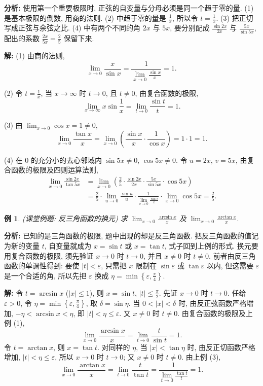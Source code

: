 \documentclass[UTF8,openany]{ctexbook}
\theoremstyle{chinesetextbook}
\newtheorem{example}{例}[section]
\newenvironment{cnsolution}{\par\indent\textbf{解:} \ignorespaces}{\par}
\begin{document}
\par\indent\textbf{分析:} 使用第一个重要极限时, 正弦的自变量与分母必须是同一个趋于零的量. (1) 是基本极限的倒数, 用商的法则. (2) 中趋于零的量是 $\displaystyle\frac1x$, 所以令 $\displaystyle t=\frac1x$. (3) 把正切写成正弦与余弦之比. (4) 中有两个不同的角 $2x$ 与 $5x$, 要分别配成 $\displaystyle\frac{\sin2x}{2x}$ 与 $\displaystyle\frac{5x}{\sin5x}$, 配出的系数 $\displaystyle\frac{2x}{5x}=\frac25$ 保留下来.
\begin{cnsolution}
(1) 由商的法则,
\[
\lim_{x\to0}\frac x{\sin x}=\frac1{\displaystyle\lim_{x\to0}\frac{\sin x}x}=1.
\]

(2) 令 $\displaystyle t=\frac1x$, 当 $x\to\infty$ 时 $t\to0$, 且 $t\ne0$, 由复合函数的极限,
\[
\lim_{x\to\infty}x\sin\frac1x=\lim_{t\to0}\frac{\sin t}t=1.
\]

(3) 由 $\displaystyle\lim_{x\to0}\cos x=1\ne0$,
\[
\lim_{x\to0}\frac{\tan x}x=\lim_{x\to0}\left(\frac{\sin x}x\cdot\frac1{\cos x}\right)=1\cdot1=1.
\]

(4) 在 $0$ 的充分小的去心邻域内 $\sin5x\ne0$, $\cos5x\ne0$. 令 $u=2x$, $v=5x$, 由复合函数的极限及四则运算法则,
\[
\begin{aligned}
\lim_{x\to0}\frac{\sin2x}{\tan5x}
&=\lim_{x\to0}\left(\frac25\cdot\frac{\sin2x}{2x}\cdot\frac{5x}{\sin5x}\cdot\cos5x\right)\\
&=\frac25\cdot\lim_{u\to0}\frac{\sin u}u\cdot\frac1{\displaystyle\lim_{v\to0}\frac{\sin v}v}\cdot\lim_{x\to0}\cos5x=\frac25.
\end{aligned}
\]
\end{cnsolution}
\begin{example}
\textnormal{(课堂例题: 反三角函数的换元)} 求 $\displaystyle\lim_{x\to0}\frac{\arcsin x}x$ 及 $\displaystyle\lim_{x\to0}\frac{\arctan x}x$.
\end{example}
\par\indent\textbf{分析:} 已知的是三角函数的极限, 题中出现的却是反三角函数. 把反三角函数的值记为新的变量 $t$, 自变量就成为 $x=\sin t$ 或 $x=\tan t$, 式子回到上例的形式. 换元要用复合函数的极限, 须先验证 $x\to0$ 时 $t\to0$, 并且 $x\ne0$ 时 $t\ne0$. 前者由反三角函数的单调性得到: 要使 $|t|<\varepsilon$, 只需把 $x$ 限制在 $\sin\varepsilon$ 或 $\tan\varepsilon$ 以内, 但这需要 $\varepsilon$ 是一个合适的角, 所以先把 $\varepsilon$ 换成 $\displaystyle\eta=\min\left\{\varepsilon,\frac\pi4\right\}$.
\begin{cnsolution}
令 $t=\arcsin x$ ($|x|\le1$), 则 $x=\sin t$, $\displaystyle|t|\le\frac\pi2$. 先证 $x\to0$ 时 $t\to0$. 任给 $\varepsilon>0$, 令 $\displaystyle\eta=\min\left\{\varepsilon,\frac\pi4\right\}$, 取 $\delta=\sin\eta$. 当 $0<|x|<\delta$ 时, 由反正弦函数严格增加, $-\eta<\arcsin x<\eta$, 即 $|t|<\eta\le\varepsilon$. 又 $x\ne0$ 时 $t\ne0$. 由复合函数的极限及上例 (1),
\[
\lim_{x\to0}\frac{\arcsin x}x=\lim_{t\to0}\frac t{\sin t}=1.
\]
令 $t=\arctan x$, 则 $x=\tan t$. 对同样的 $\eta$, 当 $|x|<\tan\eta$ 时, 由反正切函数严格增加, $|t|<\eta\le\varepsilon$, 所以 $x\to0$ 时 $t\to0$; 又 $x\ne0$ 时 $t\ne0$. 由上例 (3),
\[
\lim_{x\to0}\frac{\arctan x}x=\lim_{t\to0}\frac t{\tan t}=\frac1{\displaystyle\lim_{t\to0}\frac{\tan t}t}=1.
\]
\end{cnsolution}
\end{document}
